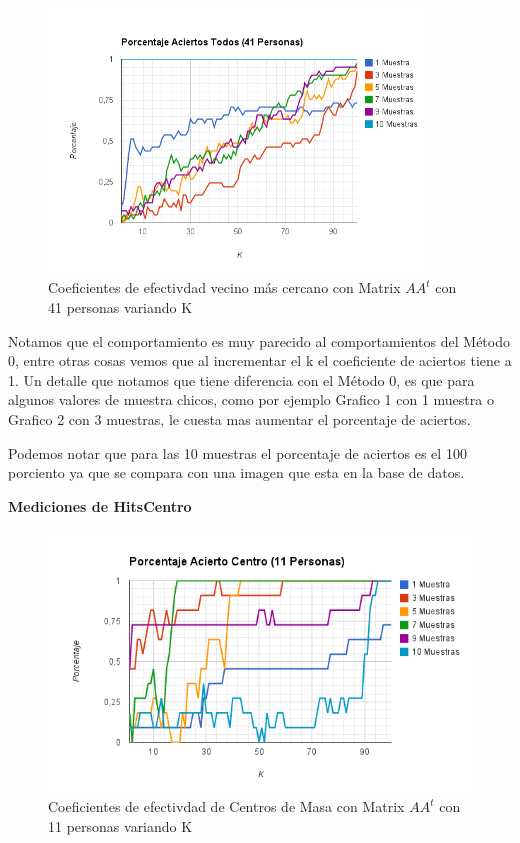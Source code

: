 \begin{figure}[H] \includegraphics[width=0.9\textwidth]{img/imagel.png} \caption{Coeficientes de
    efectivdad vecino más cercano con Matrix $AA^t$ con 41 personas variando K} \end{figure}

Notamos que el comportamiento es muy parecido al comportamientos del M\'etodo 0, entre otras cosas
vemos que al incrementar el k el coeficiente de aciertos tiene a 1.  Un detalle que notamos que
tiene diferencia con el M\'etodo 0, es que para algunos valores de muestra chicos, como por ejemplo
Grafico 1 con 1 muestra o Grafico 2 con 3 muestras, le cuesta mas aumentar el porcentaje de
aciertos.

Podemos notar  que para las 10 muestras el porcentaje de aciertos es el 100 porciento ya que se
compara con una imagen que esta en la base de datos.

\newpage

\textbf{Mediciones de HitsCentro}

\begin{figure}[H] \includegraphics[width=1\textwidth]{img/imagem.png} \caption{Coeficientes de
    efectivdad de Centros de Masa con Matrix $AA^t$ con 11 personas variando K} \end{figure}

